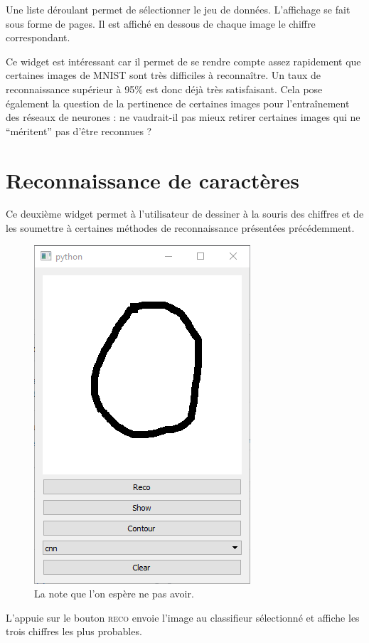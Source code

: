 Une liste déroulant permet de sélectionner le jeu de données.
L'affichage se fait sous forme de pages. 
Il est affiché en dessous de chaque image le chiffre correspondant.

Ce widget est intéressant car il permet de se rendre compte assez rapidement que 
certaines images de MNIST sont très difficiles à reconnaître. 
Un taux de reconnaissance supérieur à 95\% est donc déjà très satisfaisant.
Cela pose également la question de la pertinence de certaines images 
pour l'entraînement des réseaux de neurones : ne vaudrait-il pas mieux 
retirer certaines images qui ne ``méritent'' pas d'être reconnues ?


\section{Reconnaissance de caractères}

Ce deuxième widget permet à l'utilisateur de dessiner à la souris des chiffres 
et de les soumettre à certaines méthodes de reconnaissance présentées précédemment.

\begin{figure}[h]
  \centering
  \includegraphics[scale=0.66]{assets/draw-widget}
  \caption{La note que l'on espère ne pas avoir.}
\end{figure}

L'appuie sur le bouton \textsc{reco} envoie l'image au classifieur sélectionné 
et affiche les trois chiffres les plus probables.


